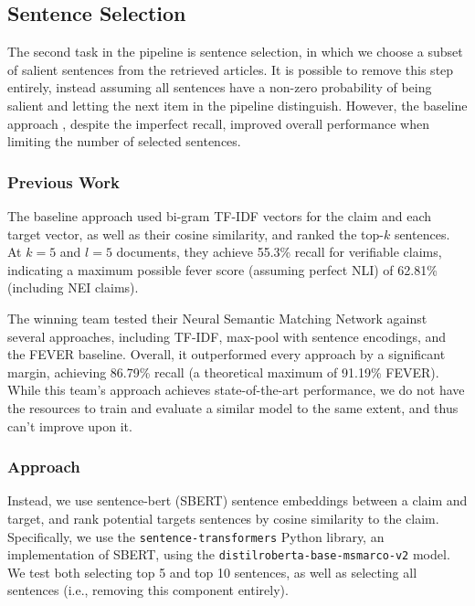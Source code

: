 \documentclass[11pt,a4paper]{article}
\begin{document}
\subsection{Sentence Selection}

The second task in the pipeline is sentence selection, in which we choose a
subset of salient sentences from the retrieved articles. It is possible to
remove this step entirely, instead assuming all sentences have a non-zero
probability of being salient and letting the next item in the pipeline distinguish.
However, the baseline approach \cite{fever2018}, despite the imperfect recall,
improved overall performance when limiting the number of selected sentences.

\subsubsection{Previous Work}%
\label{subsec:sentence-selection-prev-work}

The baseline approach used bi-gram TF-IDF vectors for the claim and each target
vector, as well as their cosine similarity, and ranked the top-$k$ sentences. At
$k=5$ and $l=5$ documents, they achieve 55.3\% recall for verifiable claims,
indicating a maximum possible fever score (assuming perfect NLI) of 62.81\%
(including NEI claims).

The winning team \cite{unc2018} tested their Neural Semantic Matching Network
against several approaches, including TF-IDF, max-pool with sentence encodings,
and the FEVER baseline. Overall, it outperformed every approach by a significant
margin, achieving 86.79\% recall (a theoretical maximum of 91.19\% FEVER). While
this team's approach achieves state-of-the-art performance, we do not have the
resources to train and evaluate a similar model to the same extent, and thus
can't improve upon it.

\subsubsection{Approach}%
\label{subsec:sentence-selection-approach}

Instead, we use sentence-bert (SBERT) sentence embeddings between a claim and
target, and rank potential targets sentences by cosine similarity to the claim.
Specifically, we use the \texttt{sentence-transformers}\cite{sbert} Python
library, an implementation of SBERT, using the
\texttt{distilroberta-base-msmarco-v2} model. We test both selecting top 5 and
top 10 sentences, as well as selecting all sentences (i.e., removing this
component entirely).
\end{document}
